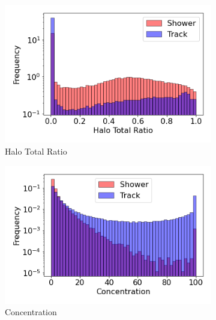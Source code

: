 \begin{figure}[htbp!]
        \centering
        \begin{subfigure}[b]{0.45\textwidth}
            \centering
            \includegraphics[width=\textwidth]{Feature_Halo_Total_Ratio}
            \caption{Halo Total Ratio}%
            \label{fig:feature_halototalratio}
        \end{subfigure}
        \hfill
        \begin{subfigure}[b]{0.45\textwidth}  
            \centering 
            \includegraphics[width=\textwidth]{Feature_Concentration}
            \caption{Concentration}%
            \label{fig:feature_concentration}
        \end{subfigure}
        \hfill
        \begin{subfigure}[b]{0.45\textwidth}  
            \centering 

\end{subfigure}
\end{figure}

